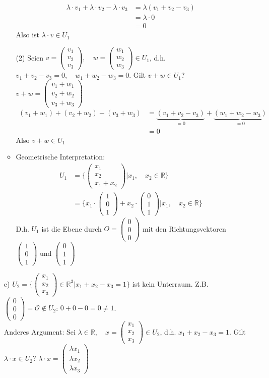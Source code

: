 \documentclass[12pt, titlepage]{article}
\newcommand{\R}{\mathds{R}}
\renewcommand{\vec}[1]{\left(\begin{array}{c}#1
	\end{array}\right)}
\renewcommand{\O}{\mathcal{O}}
\renewcommand{\>}{\rightarrow}
\renewcommand{\*}{\cdot}
\begin{document}
\begin{itemize}
\begin{itemize}
		\begin{align*}
			\lambda\*v_1+\lambda\*v_2-\lambda\*v_3&=\lambda(v_1+v_2-v_3)\\
			&=\lambda\*0\\
			&=0
		\end{align*}
		Also ist $\lambda\*v\in U_1$
		\item[(2)] Seien $v=\vec{v_1\\v_2\\v_3},\quad w=\vec{w_1\\w_2\\w_3}\in U_1$, d.h. $v_1+v_2-v_3=0,\quad w_1+w_2-w_3=0$. Gilt $v+w\in U_1$?  $v+w=\vec{v_1+w_1\\v_2+w_2\\v_3+w_3}$
		\begin{align*}
			(v_1+w_1)+(v_2+w_2)-(v_3+w_3)&=\underbrace{(v_1+v_2-v_3)}_{=0}+\underbrace{(w_1+w_2-w_3)}_{=0}\\
			&=0
		\end{align*}
		Also $v+w\in U_1$
		\item Geometrische Interpretation:\\ \begin{align*}
		U_1&=\{\vec{x_1\\x_2\\x_1+x_2}|x_1,\quad x_2\in\R\}\\
		&=\{x_1\*\vec{1\\0\\1}+x_2\*\vec{0\\1\\1}|x_1,\quad x_2\in\R\}
		\end{align*}
		D.h. $U_1$ ist die Ebene durch $O=\vec{0\\0\\0}$ mit den Richtungsvektoren $\vec{1\\0\\1}$ und $\vec{0\\1\\1}$
	\end{itemize}
	\item[c)] $U_2=\{\vec{x_1\\x_2\\x_3}\in\R^3|x_1+x_2-x_3=1\}$ ist kein Unterraum. Z.B. $\vec{0\\0\\0}=\O\notin U_2$: $0+0-0=0\neq1$.\\
	Anderes Argument: Sei $\lambda\in\R,\quad x=\vec{x_1\\x_2\\x_3}\in U_2$, d.h. $x_1+x_2-x_3=1$. Gilt $\lambda\*x\in U_2$? $\lambda\*x=\vec{\lambda x_1\\\lambda x_2\\\lambda x_3}$

\end{itemize}
\end{document}

